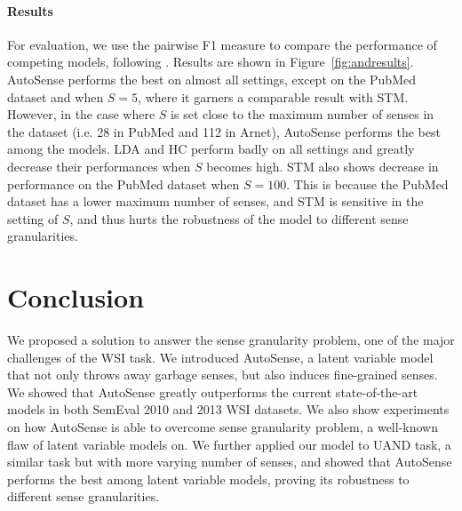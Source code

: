 \documentclass[letterpaper]{article} %
\begin{document}

\paragraph{Results}

For evaluation, we use the pairwise F1 measure to compare the performance of competing models, following \cite{tang2012unified}. Results are shown in Figure~\ref{fig:andresults}. AutoSense performs the best on almost all settings, except on the PubMed dataset and when $S=5$, where it garners a comparable result with STM. However, in the case where $S$ is set close to the maximum number of senses in the dataset (i.e. 28 in PubMed and 112 in Arnet), AutoSense performs the best among the models. LDA and HC perform badly on all settings and greatly decrease their performances when $S$ becomes high. STM also shows decrease in performance on the PubMed dataset when $S=100$. This is because the PubMed dataset has a lower maximum number of senses, and STM is sensitive in the setting of $S$, and thus hurts the robustness of the model to different sense granularities.

\section{Conclusion} %

We proposed a solution to answer the sense granularity problem, one of the major challenges of the WSI task. We introduced AutoSense, a latent variable model that not only throws away garbage senses, but also induces fine-grained senses. We showed that AutoSense greatly outperforms the current state-of-the-art models in both SemEval 2010 and 2013 WSI datasets. We also show experiments on how AutoSense is able to overcome sense granularity problem, a well-known flaw of latent variable models on. We further applied our model to UAND task, a similar task but with more varying number of senses, and showed that AutoSense performs the best among latent variable models, proving its robustness to different sense granularities.
\end{document}
